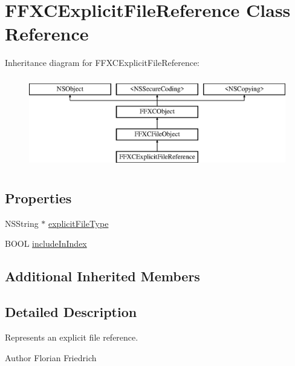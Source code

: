 \hypertarget{interface_f_f_x_c_explicit_file_reference}{\section{F\-F\-X\-C\-Explicit\-File\-Reference Class Reference}
\label{interface_f_f_x_c_explicit_file_reference}
}
Inheritance diagram for F\-F\-X\-C\-Explicit\-File\-Reference\-:\begin{figure}[H]
\begin{center}
\leavevmode
\includegraphics[height=4.000000cm]{interface_f_f_x_c_explicit_file_reference}
\end{center}
\end{figure}
\subsection*{Properties}
\begin{DoxyCompactItemize}
\item 
N\-S\-String $\ast$ \hyperlink{interface_f_f_x_c_explicit_file_reference_a39a3c9da667a30b338325ff8926965dc}{explicit\-File\-Type}
\item 
B\-O\-O\-L \hyperlink{interface_f_f_x_c_explicit_file_reference_ac032c5431013dca9e176ff977673287b}{include\-In\-Index}
\end{DoxyCompactItemize}
\subsection*{Additional Inherited Members}


\subsection{Detailed Description}
Represents an explicit file reference. \begin{DoxyAuthor}{Author}
Florian Friedrich 
\end{DoxyAuthor}


